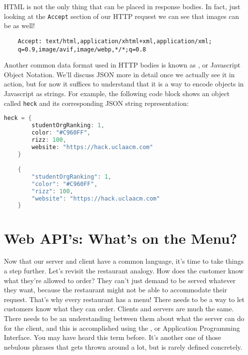 
HTML is not the only thing that can be placed in response bodies. In fact, just looking at the \texttt{Accept} section of our HTTP request we can see that images can be as well!

\begin{verbatim}
    Accept: text/html,application/xhtml+xml,application/xml;
    q=0.9,image/avif,image/webp,*/*;q=0.8
\end{verbatim}

Another common data format used in HTTP bodies is known as , or Javascript Object Notation. We'll discuss JSON more in detail once we actually see it in action, but for now it suffices to understand that it is a way to encode objects in Javascript as strings. For example, the following code block shows an object called \texttt{heck} and its corresponding JSON string representation:

\vspace{.5cm}

\begin{lstlisting}[language=Java]
    heck = {
        studentOrgRanking: 1,
        color: "#C960FF",
        rizz: 100,
        website: "https://hack.uclaacm.com"
    }

    {
        "studentOrgRanking": 1,
        "color": "#C960FF",
        "rizz": 100,
        "website": "https://hack.uclaacm.com"
    }
\end{lstlisting}


\section{Web API's: What's on the Menu?}

Now that our server and client have a common language, it's time to take things a step further. Let's revisit the restaurant analogy. How does the customer know what they're allowed to order? They can't just demand to be served whatever they want, because the restaurant might not be able to accommodate their request. That's why every restaurant has a menu! There needs to be a way to let customers know what they can order. Clients and servers are much the same. There needs to be an understanding between them about what the server can do for the client, and this is accomplished using the , or Application Programming Interface. You may have heard this term before. It's another one of those nebulous phrases that gets thrown around a lot, but is rarely defined concretely.

